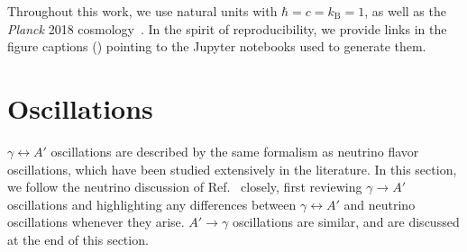 \documentclass[prd,aps,10pt,nofootinbib,twocolumn,superscriptaddress,preprintnumbers,balancelastpage,longbibliography]{revtex4-1}
\begin{document}
Throughout this work, we use natural units with $\hbar = c = k_\text{B} = 1$, as well as the \emph{Planck} 2018 cosmology~\cite{Aghanim:2019ame}. In the spirit of reproducibility, we provide links in the figure captions (\nbicon) pointing to the Jupyter notebooks used to generate them. 

\section{Oscillations}
\label{sec:oscillations}

$\gamma \leftrightarrow A'$ oscillations are described by the same formalism as neutrino flavor oscillations, which have been studied extensively in the literature. 
In this section, we follow the neutrino discussion of Ref.~\cite{Dasgupta:2005wn} closely, first reviewing $\gamma \to A'$ oscillations and highlighting any differences between $\gamma \leftrightarrow A'$ and neutrino oscillations whenever they arise. 
$A' \to \gamma$ oscillations are similar, and are discussed at the end of this section.
\end{document}
